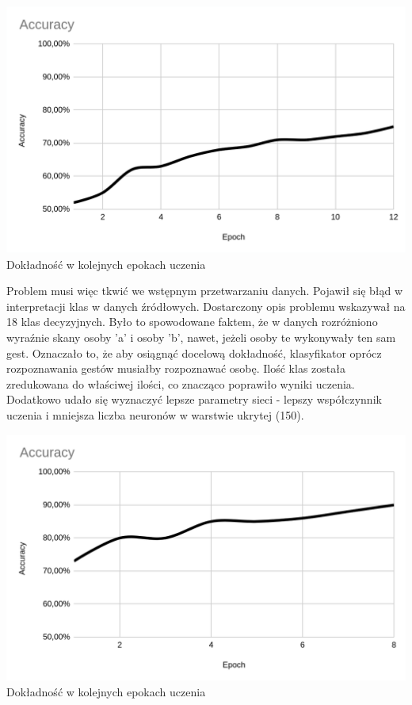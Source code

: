 \documentclass[a4paper,12pt]{article}
\begin{document}
\begin{center}
	\includegraphics[scale=0.25]{accuracy1.png}
	\\\small Dokładność w kolejnych epokach uczenia
\end{center}

\hspace{1cm}Problem musi więc tkwić we wstępnym przetwarzaniu danych. Pojawił się błąd w interpretacji klas w danych źródłowych. Dostarczony opis problemu wskazywał na 18 klas decyzyjnych. Było to spowodowane faktem, że w danych rozróżniono wyraźnie skany osoby 'a' i osoby 'b', nawet, jeżeli osoby te wykonywały ten sam gest. Oznaczało to, że aby osiągnąć docelową dokładność, klasyfikator oprócz rozpoznawania gestów musiałby rozpoznawać osobę. Ilość klas została zredukowana do właściwej ilości, co znacząco poprawiło wyniki uczenia. Dodatkowo udało się wyznaczyć lepsze parametry sieci - lepszy współczynnik uczenia i mniejsza liczba neuronów w warstwie ukrytej (150).

\begin{center}
	\includegraphics[scale=0.25]{accuracy2.png}
	\\\small Dokładność w kolejnych epokach uczenia
\end{center}
\end{document}
